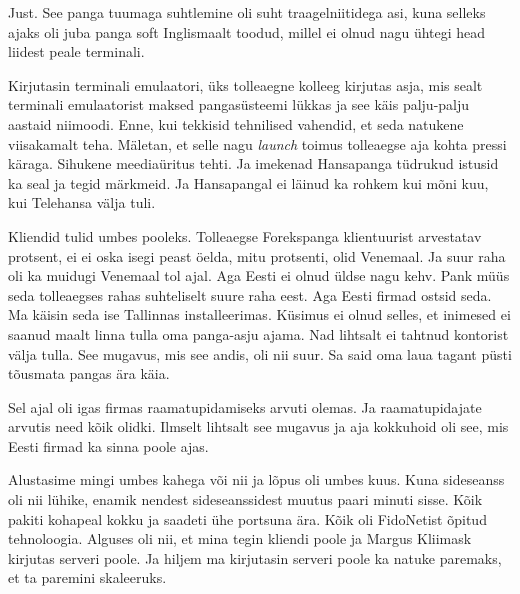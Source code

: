 
Just. See panga tuumaga suhtlemine oli suht traagelniitidega asi, kuna selleks 
ajaks oli juba panga soft  Inglismaalt toodud, millel ei olnud nagu ühtegi head 
liidest peale terminali.


Kirjutasin terminali emulaatori, üks tolleaegne kolleeg kirjutas asja, mis 
sealt terminali emulaatorist maksed pangasüsteemi lükkas ja see käis 
palju-palju aastaid niimoodi. Enne, kui  tekkisid tehnilised vahendid, et seda 
natukene viisakamalt teha. Mäletan, et  selle nagu \emph{launch} toimus 
tolleaegse  aja kohta pressi käraga. Sihukene meediaüritus tehti. Ja imekenad 
Hansapanga tüdrukud istusid ka seal ja tegid märkmeid. Ja 
Hansapangal ei läinud ka rohkem kui mõni kuu, kui 
Telehansa välja tuli.


Kliendid tulid umbes pooleks.  Tolleaegse Forekspanga klientuurist arvestatav 
protsent, ei ei oska isegi peast öelda, mitu protsenti, olid Venemaal. Ja suur 
raha oli ka muidugi Venemaal tol ajal. Aga Eesti ei olnud üldse nagu kehv. Pank 
müüs seda tolleaegses rahas suhteliselt suure raha eest. Aga Eesti firmad 
ostsid seda. Ma käisin seda ise Tallinnas installeerimas. Küsimus ei olnud 
selles, et inimesed ei saanud maalt linna tulla oma panga-asju ajama. Nad 
lihtsalt ei tahtnud kontorist välja tulla. See mugavus, mis see andis, oli nii 
suur. Sa said oma laua tagant püsti tõusmata pangas ära käia.


Sel ajal oli igas firmas raamatupidamiseks arvuti olemas. Ja raamatupidajate 
arvutis need kõik olidki. Ilmselt lihtsalt see mugavus ja aja kokkuhoid oli 
see, mis  Eesti firmad ka sinna poole ajas.


Alustasime  mingi umbes kahega või nii ja  lõpus oli  umbes kuus. Kuna 
sideseanss oli nii lühike, enamik nendest sideseanssidest muutus paari minuti 
sisse. Kõik pakiti kohapeal  kokku ja saadeti ühe portsuna ära. Kõik oli 
FidoNetist õpitud tehnoloogia. Alguses oli nii, et mina tegin kliendi poole ja 
Margus Kliimask kirjutas serveri poole. Ja hiljem 
ma kirjutasin serveri poole ka natuke paremaks, et ta paremini skaleeruks. 


